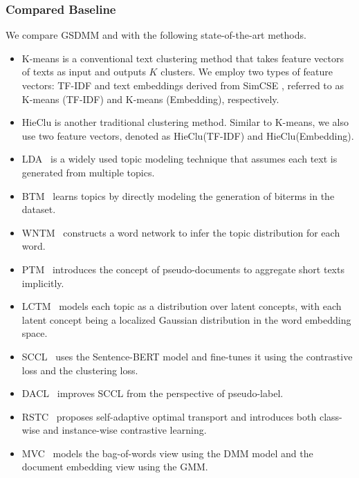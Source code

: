 \subsubsection{Compared Baseline} We compare GSDMM and \sysname{} with the following state-of-the-art methods.
\begin{itemize}
    \item K-means is a conventional text clustering method that takes feature vectors of texts as input and outputs $K$ clusters. We employ two types of feature vectors: TF-IDF and text embeddings derived from SimCSE \cite{gao2021simcse}, referred to as K-means (TF-IDF) and K-means (Embedding), respectively.
    \item HieClu is another traditional clustering method. Similar to K-means, we also use two feature vectors, denoted as HieClu(TF-IDF) and HieClu(Embedding).
    \item LDA~\cite{blei2003latent} is a widely used topic modeling technique that assumes each text is generated from multiple topics.
    \item BTM~\cite{yan2013biterm} learns topics by directly modeling the generation of biterms in the dataset.
    \item WNTM~\cite{zuo2016word} constructs a word network to infer the topic distribution for each word.
    \item PTM~\cite{zuo2016topic} introduces the concept of pseudo-documents to aggregate short texts implicitly.
    \item LCTM~\cite{hu2016latent} models each topic as a distribution over latent concepts, with each latent concept being a localized Gaussian distribution in the word embedding space.
    \item SCCL~\cite{SCCL} uses the Sentence-BERT model and fine-tunes it using the contrastive loss and the clustering loss.
    \item DACL~\cite{li2022clustering} improves SCCL from the perspective of pseudo-label.
    \item RSTC~\cite{zheng2023robust} proposes self-adaptive optimal transport and introduces both class-wise and instance-wise contrastive learning.
    \item MVC~\cite{lu2024multi} models the bag-of-words view using the DMM model and the document embedding view using the GMM.
\end{itemize}
